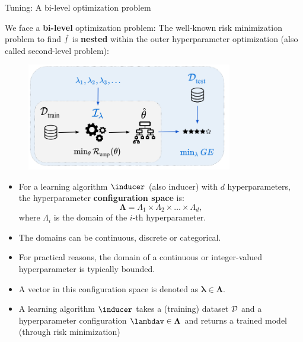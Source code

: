 \documentclass[11pt,compress,t,notes=noshow, xcolor=table]{beamer}
\begin{document}
\begin{vbframe}{Tuning: A bi-level optimization problem} 

\vspace{0.2cm} 

We face a \textbf{bi-level} optimization problem: The well-known risk minimization problem to find $\hat{f}$ is \textbf{nested} within the outer hyperparameter optimization (also called second-level problem):

\begin{center}
\begin{figure}
\includegraphics[width=0.8\textwidth]{figure_man/riskmin_bilevel3.png}
\end{figure}
\end{center}

\framebreak
  
  \begin{itemize}
    \item For a learning algorithm $\inducer$ (also inducer) with $d$ hyperparameters, the hyperparameter \textbf{configuration space} is:
      $$\bm{\Lambda}=\Lambda_{1} \times \Lambda_{2} \times \ldots \times \Lambda_{d},$$
      where $\Lambda_{i}$ is the domain of the $i$-th hyperparameter.
    \item The domains can be continuous, discrete or categorical.
    \item For practical reasons, the domain of a continuous or integer-valued hyperparameter is typically bounded.
    \item A vector in this configuration space is denoted as $\bm{\lambda} \in \bm{\Lambda}$.
    \item A learning algorithm $\inducer$ takes a (training) dataset $\mathcal{D}$ and a hyperparameter configuration $\lambdav \in \bm{\Lambda}$ and returns a trained model (through risk minimization)


\end{itemize}
\end{vbframe}
\end{document}
